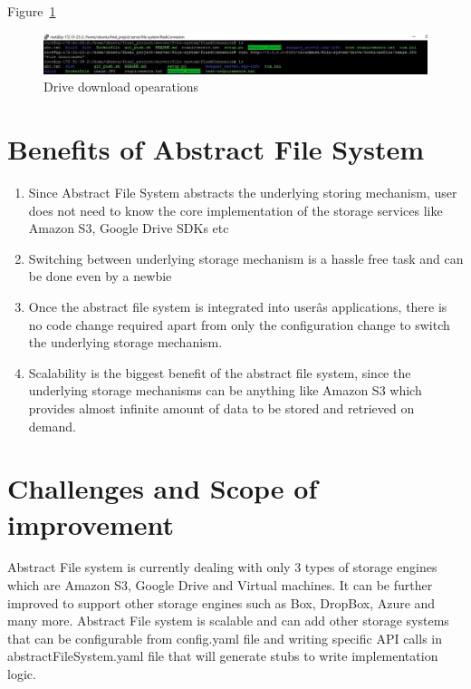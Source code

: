 Figure~\ref{fig:drive-download}

\begin{figure}[!ht]
        \centering\includegraphics[width=\columnwidth]
        {image/drive-download.JPG}
        \caption{Drive download opearations}\label{fig:drive-download}
\end{figure}


\section{Benefits of Abstract File System}
\begin{enumerate}
    \item Since Abstract File System abstracts the underlying storing 
mechanism, user does not need to know the core implementation of the storage 
services like Amazon S3, Google Drive SDKs etc
    
    \item Switching between underlying storage mechanism is a hassle free task 
and can be done even by a newbie
    
    \item Once the abstract file system is integrated into userâs 
applications, there is no code change required apart from only the 
configuration change to switch the underlying storage mechanism.
    
    \item Scalability is the biggest benefit of the abstract file system, 
since the underlying storage mechanisms can be anything like Amazon S3 which 
provides almost infinite amount of data to be stored and retrieved on demand.
    
\end{enumerate}

\section{Challenges and Scope of improvement}
Abstract File system is currently dealing with only 3 types of storage engines 
which are Amazon S3, Google Drive and Virtual machines. It can be further 
improved to support other storage engines such as Box, DropBox, Azure and many 
more. Abstract File system is scalable and can add other storage systems that 
can be configurable from config.yaml file and writing specific API calls in 
abstractFileSystem.yaml file that will generate stubs to write implementation 
logic. 


